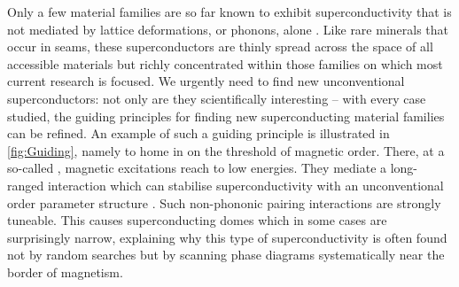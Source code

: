 Only a few material families are so far known to exhibit superconductivity
that is not mediated by lattice deformations, or phonons, alone \cite{monthoux07,norman11}. Like rare minerals that occur in seams, these superconductors are thinly spread across the space of all accessible materials but richly concentrated within those families on which most current research is focused.
We urgently need to find new unconventional superconductors: 
not only are they scientifically interesting -- with every case  studied, the guiding principles for finding new superconducting material families can be refined.
An example of such a guiding principle is illustrated in \autoref{fig:Guiding}, namely to home in on the threshold of magnetic order. There, at a so-called  , magnetic excitations reach to low energies. They mediate a long-ranged interaction which can stabilise superconductivity with an unconventional order parameter structure %
\cite{monthoux07}. Such non-phononic pairing interactions are strongly tuneable. This causes superconducting domes 
which in some cases are surprisingly narrow, explaining why this type of superconductivity is often found not by random searches but by scanning phase diagrams systematically near the border of magnetism. %

